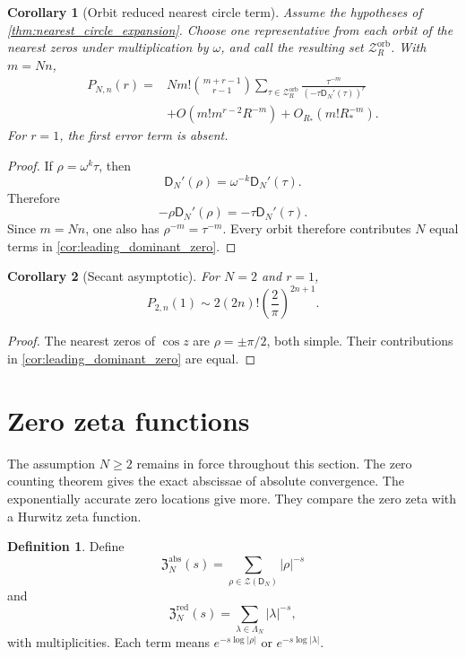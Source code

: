 \documentclass[11pt]{article}
\newtheorem{corollary}[corollary]{Corollary}
\theoremstyle{definition}
\newtheorem{definition}[definition]{Definition}
\theoremstyle{remark}
\newcommand{\Zcal}{\mathcal Z}
\newcommand{\Dfun}{\mathsf D}
\begin{document}
\begin{corollary}[Orbit reduced nearest circle term]\label{cor:orbit_reduced_asymptotic}
Assume the hypotheses of \cref{thm:nearest_circle_expansion}.  Choose one representative from each orbit of the nearest zeros under multiplication by $\omega$, and call the resulting set $\Zcal_R^{\mathrm{orb}}$.  With $m=Nn$,
\[
\begin{aligned}
P_{N,n}(r)
={}&N m!\binom{m+r-1}{r-1}
\sum_{\tau\in\Zcal_R^{\mathrm{orb}}}
\frac{\tau^{-m}}{(-\tau\Dfun_N'(\tau))^r}
\\
&+O\left(m!m^{r-2}R^{-m}\right)
+O_{R_*}\left(m!R_*^{-m}\right).
\end{aligned}
\]
For $r=1$, the first error term is absent.
\end{corollary}

\begin{proof}
If $\rho=\omega^k\tau$, then
\[
\Dfun_N'(\rho)=\omega^{-k}\Dfun_N'(\tau).
\]
Therefore
\[
-\rho\Dfun_N'(\rho)
=-\tau\Dfun_N'(\tau).
\]
Since $m=Nn$, one also has $\rho^{-m}=\tau^{-m}$.  Every orbit therefore contributes $N$ equal terms in \cref{cor:leading_dominant_zero}.
\end{proof}

\begin{corollary}[Secant asymptotic]\label{cor:secant_asymptotic}
For $N=2$ and $r=1$,
\[
P_{2,n}(1)
\sim
2(2n)!\left(\frac2\pi\right)^{2n+1}.
\]
\end{corollary}

\begin{proof}
The nearest zeros of $\cos z$ are $\rho=\pm\pi/2$, both simple.  Their contributions in \cref{cor:leading_dominant_zero} are equal.
\end{proof}

\section{Zero zeta functions}\label{sec:zero_zeta}

The assumption $N\geq2$ remains in force throughout this section.  The zero counting theorem gives the exact abscissae of absolute convergence.  The exponentially accurate zero locations give more.  They compare the zero zeta with a Hurwitz zeta function.

\begin{definition}\label{def:absolute_zero_zetas}
Define
\[
\mathfrak Z_N^{\mathrm{abs}}(s)
=
\sum_{\rho\in\Zcal(\Dfun_N)}|\rho|^{-s}
\]
and
\[
\mathfrak Z_N^{\mathrm{red}}(s)
=
\sum_{\lambda\in\Lambda_N}|\lambda|^{-s},
\]
with multiplicities.  Each term means $e^{-s\log|\rho|}$ or $e^{-s\log|\lambda|}$.
\end{definition}
\end{document}
